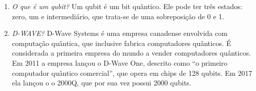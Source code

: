 \documentclass[12pt]{article}
\begin{document}
\begin{enumerate}
\item \textit{O que é um qubit?} Um qubit é um bit quântico. Ele pode ter três
estados: zero, um e intermediário, que trata-se de uma sobreposição de 0 e 1.

\item \textit{D-WAVE?} D-Wave Systems é uma empresa canadense envolvida com
computação quântica, que inclusive fabrica computadores quânticos. É considerada
a primeira empresa do mundo a vender computadores quânticos. Em 2011 a empresa
lançou o D-Wave One, descrito como ``o primeiro computador quântico comercial'',
que opera em chips de 128 qubits. Em 2017 ela lançou o o 2000Q, que por sua vez
possui 2000 qubits.

\end{enumerate}
\end{document}
